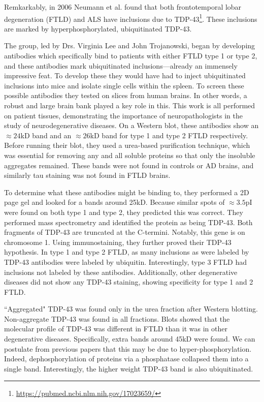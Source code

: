 Remkarkably, in 2006 Neumann et al. found that both frontotemporal lobar degeneration (FTLD) and ALS have inclusions due to TDP-43\footnote{\url{https://pubmed.ncbi.nlm.nih.gov/17023659/}}. These inclusions are marked by hyperphosphorylated, ubiquitinated TDP-43.\newline 

The group, led by Drs. Virginia Lee and John Trojanowski, began by developing antibodies which specifically bind to patients with either FTLD type 1 or type 2, and these antibodies mark ubiquitinated inclusions---already an immensely impressive feat. To develop these they would have had to inject ubiquitinated inclusions into mice and isolate single cells within the spleen. To screen these possible antibodies they tested on slices from human brains. In other words, a robust and large brain bank played a key role in this. This work is all performed on patient tissues, demonstrating the importance of neuropathologists in the study of neurodegenerative diseases. On a Western blot, these antibodies show an $\approx 24$kD band and an $\approx 26$kD band for type 1 and type 2 FTLD respectively. Before running their blot, they used a urea-based purification technique, which was essential for removing any and all soluble proteins so that only the insoluble aggregates remained. These bands were not found in controls or AD brains, and similarly tau staining was not found in FTLD brains.\newline

To determine what these antibodies might be binding to, they performed a 2D page gel and looked for a bands around 25kD. Because similar spots of $\approx 3.5$pI were found on both type 1 and type 2, they predicted this was correct. They performed mass spectrometry and identified the protein as being TDP-43. Both fragments of TDP-43 are truncated at the C-termini. Notably, this gene is on chromosome 1. Using immunostaining, they further proved their TDP-43 hypothesis. In type 1 and type 2 FTLD, as many inclusions as were labeled by TDP-43 antibodies were labeled by ubiquitin. Interestingly, type 3 FTLD had inclusions not labeled by these antibodies. Additionally, other degenerative diseases did not show any TDP-43 staining, showing specificity for type 1 and 2 FTLD.\newline

``Aggregated" TDP-43 was found only in the urea fraction after Western blotting. Non-aggregate TDP-43 was found in all fractions. Blots showed that the molecular profile of TDP-43 was different in FTLD than it was in other degenerative diseases. Specifically, extra bands around 45kD were found. We can postulate from previous papers that this may be due to hyper-phosphorylation. Indeed,  dephosphorylation of proteins via a phosphatase collapsed them into a single band. Interestingly, the higher weight TDP-43 band is also ubiquitinated.\newline

